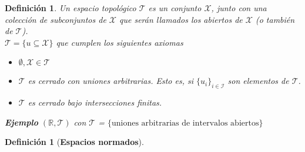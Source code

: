 \documentclass[12pt]{article}
\newtheorem{dfn}[thm]{Definición}
\begin{document}
	\MakeScribeTop


\begin{dfn}
Un espacio topológico $\mathcal{T}$ es un conjunto $\mathcal{X}$, junto con una colección de subconjuntos de $\mathcal{X}$ que serán llamados los abiertos de $\mathcal{X}$ (o también de $\mathcal{T}$).\\
$\mathcal{T} = \{ u \subseteq \mathcal{X}\}$ que cumplen los siguientes axiomas
\begin{itemize}
    \item $\emptyset, \mathcal{X} \in \mathcal{T}$

    \item $\mathcal{T}$ es cerrado con uniones arbitrarias. Esto es, si $\{ u_i\}_{i \in \mathcal{I}}$ son elementos de $\mathcal{T}$.

     \item $\mathcal{T}$ es cerrado bajo intersecciones finitas.
\end{itemize}

\noindent \textbf{Ejemplo}
$(\mathbb{R}, \mathcal{T})$ con $\mathcal{T}$ = $\{ \text{uniones arbitrarias de intervalos abiertos} \}$
\end{dfn}

\begin{dfn}[\textbf{Espacios normados}]
\end{dfn}
\end{document}
